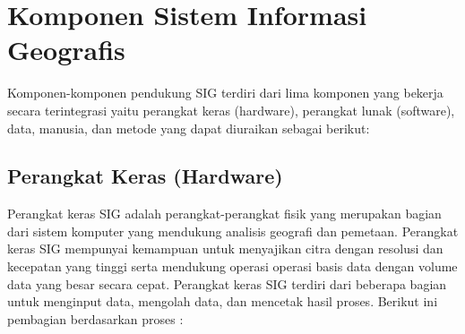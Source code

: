 \section{Komponen Sistem Informasi Geografis}
Komponen-komponen pendukung SIG terdiri dari lima komponen yang bekerja secara terintegrasi yaitu perangkat keras (hardware), perangkat lunak (software), data, manusia, dan metode yang dapat diuraikan sebagai berikut:

\subsection{Perangkat Keras (Hardware)}
 Perangkat keras SIG adalah perangkat-perangkat fisik yang merupakan bagian dari sistem komputer yang mendukung analisis geografi dan pemetaan. Perangkat keras SIG mempunyai kemampuan untuk menyajikan citra dengan resolusi dan kecepatan yang tinggi serta mendukung operasi operasi basis data dengan volume data yang besar secara cepat. Perangkat keras SIG terdiri dari beberapa bagian untuk menginput data, mengolah data, dan mencetak hasil proses. Berikut ini pembagian berdasarkan proses :

